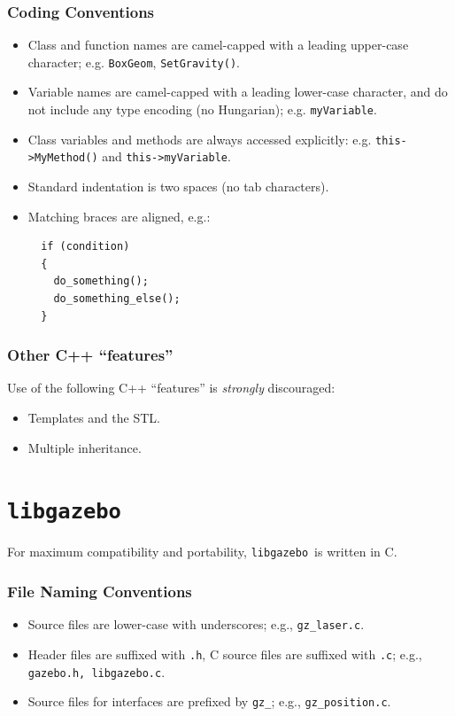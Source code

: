 \documentclass[11pt]{report}
\def\libgazebo {{\tt libgazebo}~}
\begin{document}
\subsubsection{Coding Conventions}

\begin{itemize}
\item Class and function names are camel-capped with a leading
upper-case character; e.g. {\tt BoxGeom}, {\tt SetGravity()}.
\item Variable names are camel-capped with a leading lower-case
character, and do not include any type encoding (no Hungarian);
e.g. {\tt myVariable}.
\item Class variables and methods are always accessed explicitly:
e.g. {\tt this->MyMethod()} and {\tt this->myVariable}.
\item Standard indentation is two spaces (no tab characters).
\item Matching braces are aligned, e.g.:
  \begin{verbatim}
  if (condition)
  {
    do_something();
    do_something_else();
  }
  \end{verbatim}
\end{itemize}


\subsubsection{Other C++ ``features''}

Use of the following C++ ``features'' is {\em strongly} discouraged:
\begin{itemize}
\item Templates and the STL.
\item Multiple inheritance.
\end{itemize}


\section{\libgazebo}

For maximum compatibility and portability, \libgazebo is written in C.


\subsubsection{File Naming Conventions}

\begin{itemize}
\item Source files are lower-case with underscores; e.g., {\tt gz\_laser.c}.
\item Header files are suffixed with {\tt .h}, C source files are
suffixed with {\tt .c}; e.g., {\tt gazebo.h, libgazebo.c}.
\item Source files for interfaces are prefixed by {\tt gz\_}; e.g.,
{\tt gz\_position.c}.
\end{itemize}
\end{document}
